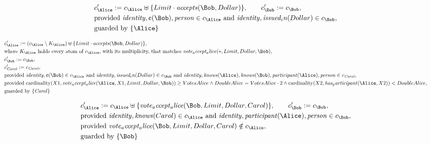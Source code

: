 \begin{align*}
&
c'_
{
\Alice
}
 := 
c_
{
\Alice
}
 \uplus 
\{
Limit
\cdot
\mathit{
accepts
}
(
\Bob
,
Dollar
)
\}
, \qquad 
c'_
{
\Bob
}
 := 
c_
{
\Bob
}
,\\
&
\text{provided } 
\mathit{
identity
}
,
\text{\textcent}
(
\Bob
)
,
\mathit{
person
}
 \in c_
{
\Alice
}
 \text{ and } 
\mathit{
identity
}
,
\mathit{
issued_in
}
(
Dollar
)
 \in c_
{
\Bob
}
,\\
&
\text{guarded by } \{
\Alice
\}
\end{align*}

\begin{align*}
&
c'_
{
\Alice
}
 := 
(
c_
{
\Alice
}
 \setminus K_
{
\Alice
}
) \uplus 
\{
Limit
\cdot
\mathit{
accepts
}
(
\Bob
,
Dollar
)
\}
,\\
&
\text{where } K_
{
\Alice
}
 \text{ holds every atom of } c_
{
\Alice
}
 \text{, with its multiplicity, that matches } 
\mathit{
vote_accept_alice
}
(
\ast
,
Limit
,
Dollar
,
\Bob
)
,\\
&
c'_
{
\Bob
}
 := 
c_
{
\Bob
}
,\\
&
c'_
{
\mathit{Carol}
}
 := 
c_
{
\mathit{Carol}
}
,\\
&
\text{provided } 
\mathit{
identity
}
,
\text{\textcent}
(
\Bob
)
 \in c_
{
\Alice
}
 \text{ and } 
\mathit{
identity
}
,
\mathit{
issued_in
}
(
Dollar
)
 \in c_
{
\Bob
}
 \text{ and } 
\mathit{
identity
}
,
\mathit{
knows
}
(
\Alice
)
,
\mathit{
knows
}
(
\Bob
)
,
\mathit{
participant
}
(
\Alice
)
,
\mathit{
person
}
 \in c_
{
\mathit{Carol}
}
,\\
&
\text{provided } 
\mathrm{cardinality}(
X1
,
\mathit{
vote_accept_alice
}
(
\Alice
,
X1
,
Limit
,
Dollar
,
\Bob
)
)
\ge
VotesAlice
\land
DoubleAlice
=
VotesAlice
\cdot
2
\land
\mathrm{cardinality}(
X2
,
\mathit{
has_participant
}
(
\Alice
,
X2
)
)
<
DoubleAlice
,\\
&
\text{guarded by } \{
\mathit{Carol}
\}
\end{align*}

\begin{align*}
&
c'_
{
\Alice
}
 := 
c_
{
\Alice
}
 \uplus 
\{
\mathit{
vote_accept_alice
}
(
\Bob
,
Limit
,
Dollar
,
Carol
)
\}
, \qquad 
c'_
{
\Bob
}
 := 
c_
{
\Bob
}
,\\
&
\text{provided } 
\mathit{
identity
}
,
\mathit{
knows
}
(
Carol
)
 \in c_
{
\Alice
}
 \text{ and } 
\mathit{
identity
}
,
\mathit{
participant
}
(
\Alice
)
,
\mathit{
person
}
 \in c_
{
\Bob
}
,\\
&
\text{provided } 
\mathit{
vote_accept_alice
}
(
\Bob
,
Limit
,
Dollar
,
Carol
)
 \notin c_
{
\Alice
}
,\\
&
\text{guarded by } \{
\Bob
\}
\end{align*}
